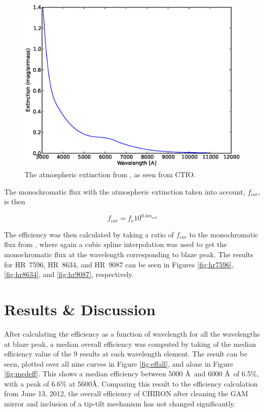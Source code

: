 \documentclass[iop]{emulateapj}
\begin{document}
\begin{figure}[ht]
\includegraphics[scale=0.4,angle=0]{fig_Exinction.eps}
\caption{\label{fig:extinction} The atmospheric extinction from \citet{Stritzinger:2005dt}, as seen from CTIO.}
\end{figure}

The monochromatic flux with the atmospheric extinction taken into account, $f_{cor}$, is then

\begin{equation}
f_{cor} = f_{\nu}10^{0.4m_{ext}}
\end{equation}

The efficiency was then calculated by taking a ratio of $f_{cor}$ to the monochromatic flux from \citep{1994PASP..106..566H}, where again a cubic spline interpolation was used to get the monochromatic flux at the wavelength corresponding to blaze peak. The results for HR~7596, HR~8634, and HR~9087 can be seen in Figures \ref{fig:hr7596}, \ref{fig:hr8634}, and \ref{fig:hr9087}, respectively. 

\section{Results \& Discussion}

After calculating the efficiency as a function of wavelength for all the wavelengths at blaze peak, a median overall efficiency was computed by taking of the median efficiency value of the 9 results at each wavelength element. The result can be seen, plotted over all nine curves in Figure \ref{fig:effall}, and alone in Figure \ref{fig:medeff}. This shows a median efficiency between 5000 \AA~and 6000 \AA~of 6.5\%, with a peak of 6.6\% at 5600\AA. Comparing this result to the efficiency calculation from June 13, 2012, the overall efficiency of CHIRON after cleaning the GAM mirror and inclusion of a tip-tilt mechanism has not changed significantly. 
\end{document}
